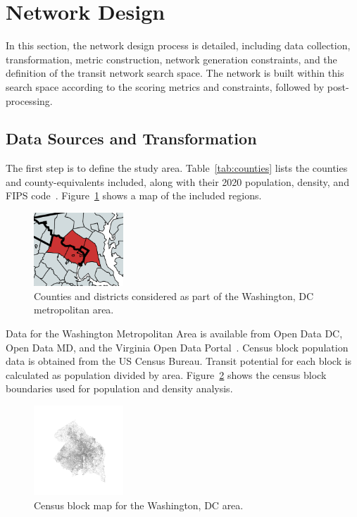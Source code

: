 \documentclass[sigconf,nonacm]{acmart}
\begin{document}
\section{Network Design}

In this section, the network design process is detailed, including data collection, transformation, metric construction, network generation constraints, and the definition of the transit network search space. The network is built within this search space according to the scoring metrics and constraints, followed by post-processing.

\subsection{Data Sources and Transformation}
The first step is to define the study area. Table~\ref{tab:counties} lists the counties and county-equivalents included, along with their 2020 population, density, and FIPS code~\cite{lit:census}. Figure~\ref{fig:area_considered} shows a map of the included regions.
\begin{figure}[h]
    \centering
    \includegraphics[width=0.3\textwidth]{./img/area_considered.png}
    \caption{Counties and districts considered as part of the Washington, DC metropolitan area.}
    \label{fig:area_considered}
\end{figure}

Data for the Washington Metropolitan Area is available from Open Data DC, Open Data MD, and the Virginia Open Data Portal~\cite{lit:opendata}. Census block population data is obtained from the US Census Bureau. Transit potential for each block is calculated as population divided by area. Figure~\ref{fig:city_map} shows the census block boundaries used for population and density analysis.

\begin{figure}[h]
    \centering
    \includegraphics[width=0.3\textwidth]{./img/city_map.png}
    \caption{Census block map for the Washington, DC area.}
    \label{fig:city_map}
\end{figure}
\end{document}
